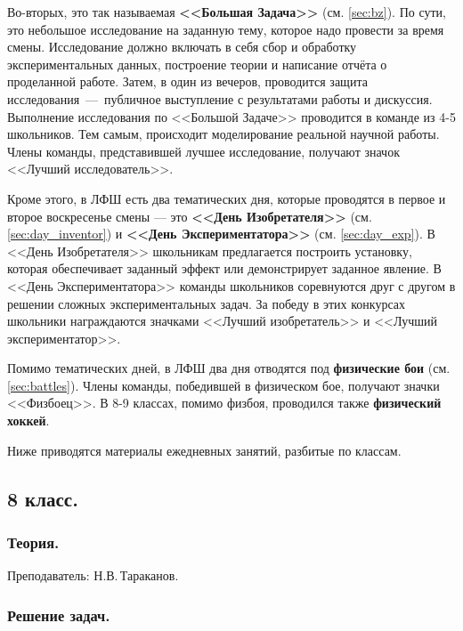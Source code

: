 \documentclass[12pt,a4paper,oneside]{scrartcl}
\newlength{\h}
\newlength{\x}
\begin{document}
Во-вторых, это так называемая \textbf{<<Большая Задача>>}
(см. \ref{sec:bz}). По сути, это небольшое исследование на заданную
тему, которое надо провести за время смены. Исследование должно
включать в себя сбор и обработку экспериментальных данных, построение
теории и написание отчёта о проделанной работе. Затем, в один из
вечеров, проводится защита исследования~---~публичное выступление с
результатами работы и дискуссия. Выполнение исследования по <<Большой
Задаче>> проводится в команде из 4-5 школьников. Тем самым, происходит
моделирование реальной научной работы. Члены команды, представившей
лучшее исследование, получают значок <<Лучший исследователь>>.

Кроме этого, в ЛФШ есть два тематических дня, которые проводятся в
первое и второе воскресенье смены --- это \textbf{<<День Изобретателя>>}
(см. \ref{sec:day_inventor}) и \textbf{<<День Экспериментатора>>}
(см. \ref{sec:day_exp}). В <<День Изобретателя>> школьникам
предлагается построить установку, которая обеспечивает заданный эффект
или демонстрирует заданное явление. В <<День Экспериментатора>>
команды школьников соревнуются друг с другом в решении сложных
экспериментальных задач. За победу в этих конкурсах школьники
награждаются значками <<Лучший изобретатель>> и <<Лучший
экспериментатор>>.

Помимо тематических дней, в ЛФШ два дня отводятся под
\textbf{физические бои} (см. \ref{sec:battles}). Члены команды,
победившей в физическом бое, получают значки <<Физбоец>>. В 8-9
классах, помимо физбоя, проводился также \textbf{физический хоккей}.

Ниже приводятся материалы ежедневных занятий, разбитые по классам. 

\subsection{8 класс.}
\label{sec:daily_8}

\subsubsection{Теория.}
\label{sec:daily_8_th}

\textsf{Преподаватель: Н.В.\,Тараканов.}
\smallskip



\subsubsection{Решение задач.}
\label{sec:daily_8_problems}
\end{document}
